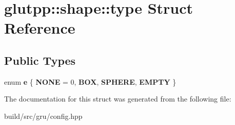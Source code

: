 \hypertarget{structglutpp_1_1shape_1_1type}{\section{glutpp\-:\-:shape\-:\-:type \-Struct \-Reference}
\label{structglutpp_1_1shape_1_1type}
}
\subsection*{\-Public \-Types}
\begin{DoxyCompactItemize}
\item 
enum {\bfseries e} \{ {\bfseries \-N\-O\-N\-E} =  0, 
{\bfseries \-B\-O\-X}, 
{\bfseries \-S\-P\-H\-E\-R\-E}, 
{\bfseries \-E\-M\-P\-T\-Y}
 \}
\end{DoxyCompactItemize}


\-The documentation for this struct was generated from the following file\-:\begin{DoxyCompactItemize}
\item 
build/src/gru/config.\-hpp\end{DoxyCompactItemize}
